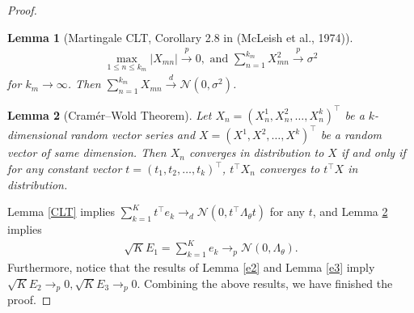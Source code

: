 \documentclass{article}
\newtheorem{lemma}{Lemma}[section]
\numberwithin{equation}{section}
\begin{document}
\begin{proof}
\begin{lemma}[Martingale CLT, Corollary 2.8 in (McLeish et al., 1974)]
\begin{align*}
    \max _{1\leq n\leq k_m}\left\vert X_{mn}\right\vert\stackrel{p}{\rightarrow}0,\textrm{ and } \sum_{n=1}^{k_m}X_{mn}^2\stackrel{p}{\rightarrow}\sigma^2
\end{align*}
for $k_m\rightarrow\infty$. Then $\sum_{n=1}^{k_m}X_{mn}\stackrel{d}{\rightarrow}\mathcal{N}\left(0,\sigma^2\right)$.
\end{lemma}
\begin{lemma}[Cramér–Wold Theorem] 
\label{CW_thm}
Let $X_n=(X_n^1,X_n^2,\ldots,X_n^k)^\top$ be a $k$-dimensional random vector series and $X=(X^1,X^2,\ldots,X^k)^\top$ be a random vector of same dimension. Then $X_n$ converges in distribution to $X$ if and only if for any constant vector $t=(t_1,t_2,\ldots,t_k)^\top$, $t^\top X_n$ converges to $t^\top X$ in distribution.
\end{lemma}
Lemma \ref{CLT} implies $\sum_{k=1}^K t^\top e_k\rightarrow_d\mathcal{N}(0,t^\top\Lambda_\theta t)$ for any $t$, and Lemma \ref{CW_thm} implies
\begin{align*}
    \sqrt{K}E_1=\sum_{k=1}^K e_k\rightarrow_p\mathcal{N}(0,\Lambda_\theta). 
\end{align*}
Furthermore, notice that the results of Lemma \ref{e2} and Lemma \ref{e3} imply $\sqrt{K}E_2\rightarrow_p 0, \sqrt{K}E_3\rightarrow_p 0$. Combining the above results, we have finished the proof. 
\end{proof}
\end{document}
